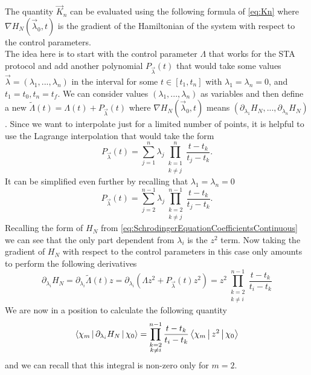 The quantity $ \vec{ K }_{n} $ can be evaluated using the following formula of \cref{eq:Kn} where $ \nabla H_{N}(\vec{ \lambda }_{0}, t)$ is the gradient of the Hamiltonian of the system with respect to the control parameters.\\
The idea here is to start with the control parameter $ \Lambda $ that works for the STA protocol and add another polynomial $ P_{\vec{\lambda}}(t) $ that would take some values $ \vec{\lambda}  = (\lambda_{1},..., \lambda_{n})$ in the interval for some $ t \in [t_1, t_{n}] $ with $ \lambda_{1} = \lambda_{n} = 0 $, and $ t_{1}  = t_0 , t_{n} = t_{f} $.
We can consider values $ (\lambda_{1},..., \lambda_n) $ as variables and then define a new $ \tilde{\Lambda}(t) = \Lambda(t) +   P_{\vec{\lambda}}(t) $ where $ \nabla H_{N}(\vec{\lambda}_0,t) $ means $ (\partial_{\lambda_1} H_{N},..., \partial_{\lambda_n} H_{N}) $.
Since we want to interpolate just for a limited number of points, it is helpful to use the Lagrange interpolation that would take the form
\begin{equation}
	\label{eq:LagrangeInterpolationPolynomial}
	P_{\vec{ \lambda }}(t) = \sum_{j=1}^{n}\lambda_{j}\prod_{\substack{k=1\\k\neq j }}^{n}\frac{t-t_{k}}{t_{j} - t_{k}}.
\end{equation}
It can be simplified even further by recalling that $ \lambda_{1} = \lambda_{n} = 0 $
\begin{equation}
	\label{eq:LagrangeInterpolationPolynomialSimplified}
	P_{\vec{ \lambda }}(t) = \sum_{j=2}^{n-1}\lambda_{j}\prod_{\substack{k=2\\k\neq j }}^{n-1}\frac{t-t_{k}}{t_{j} - t_{k}}.
\end{equation}
Recalling the form of $   H_{N} $ from \cref{eq:SchrodingerEquationCoefficientsContinuous} we can see that the only part dependent from $ \lambda_{i} $ is the $ z^2 $ term.
Now taking the gradient of $ H_{N} $ with respect to the control parameters in this case only amounts to perform the following derivatives
\begin{equation}
	\label{eq:GradientLambda}
	\partial_{\lambda_i} H_{N}=\partial_{\lambda_i} \tilde{ \Lambda }(t)z = \partial_{\lambda_i} \left(\Lambda z^2 + P_{\vec{ \lambda }}(t)z^2    \right) =z^2\prod_{\substack{k=2\\k\neq i }}^{n-1}\frac{t-t_{k}}{t_{i} - t_{k}}
\end{equation}
We are now in a position to calculate the following quantity
\begin{equation}
	\label{eq:KnOverSpace}
    \Braket{\chi_{m}|\partial_{\lambda_i} H_{N}|\chi_{0}} = \prod_{\substack{k=2\\k\neq i }}^{n-1}\frac{t-t_{k}}{t_{i} - t_{k}} \Braket{\chi_{m}|z^2 |\chi_{0}}
\end{equation}
and we can recall that this integral is non-zero only for $ m = 2 $.
